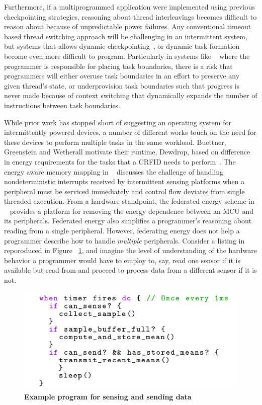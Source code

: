 \documentclass[11pt]{sensys-proc}
\begin{document}
Furthermore, if a multiprogrammed application were implemented using previous
checkpointing strategies, reasoning about thread interleavings becomes  difficult to
reason about because of unpredictable power failures. Any conventional timeout based
thread switching approach will be challenging in an intermittent system, but systems that
allows dynamic checkpointing~\cite{hibernus}, or dynamic task formation~\cite{Dino} become
even more difficult to program. Particularly in systems like ~\cite{Dino} where the
programmer is responsible for placing task boundaries, there is a risk that programmers
will either overuse task boundaries in an effort to preserve any given thread's state, or
underprovision task boundaries such that progress is never made because of context
switching that dynamically expands the number of instructions between task boundaries. 

While prior work has stopped short of suggesting an operating system for intermittently
powered devices, a number of different works touch on the need for these devices to
perform multiple tasks in the same workload. Buettner, Greenstein and Wetherall motivate
their runtime, Dewdrop, based on difference in energy requirements for the tasks that a
CRFID needs to perform~\cite{dewdrop}. The energy aware memory mapping in ~\cite{Aware}
discusses the challenge of handling nondeterministic interrupts received by intermittent
sensing platforms when a peripheral must be serviced immediately and control flow deviates
from single threaded execution. From a hardware standpoint, the federated energy scheme in
~\cite{ufop} provides a platform for removing the energy dependence between an MCU and its
peripherals. Federated energy also simplifies a programmer's reasoning about reading from
a single peripheral. However, federating energy does not help a programmer describe how to
handle {\em multiple} peripherals. Consider a listing in
~\cite{ufop} reporoduced in Figure ~\ref{fig:copy}, and imagine the level of understanding
of the hardware behavior a programmer would have to employ to, say, read one sensor if it
is available but read from and proceed to process data from a different sensor if it is not. 

\begin{figure}[h]
  \centering
  \includegraphics[width=0.99\columnwidth]{figs/listing}
  \caption{{\bf Example program for sensing and sending data}}
  \label{fig:copy}
\end{figure}
\end{document}
